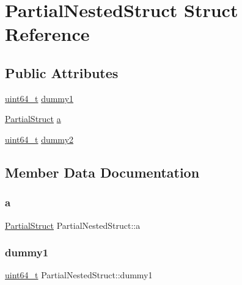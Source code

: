 \hypertarget{struct_partial_nested_struct}{}\section{Partial\+Nested\+Struct Struct Reference}
\label{struct_partial_nested_struct}
\subsection*{Public Attributes}
\begin{DoxyCompactItemize}
\item 
\mbox{\hyperlink{_s_d_l__config_8h_aaa5d1cd013383c889537491c3cfd9aad}{uint64\+\_\+t}} \mbox{\hyperlink{struct_partial_nested_struct_a21905dc8e8423ea3d8f5df0dec057d5c}{dummy1}}
\item 
\mbox{\hyperlink{struct_partial_struct}{Partial\+Struct}} \mbox{\hyperlink{struct_partial_nested_struct_afdf4565a5a3f3da3d3d3c2c9d518cfa8}{a}}
\item 
\mbox{\hyperlink{_s_d_l__config_8h_aaa5d1cd013383c889537491c3cfd9aad}{uint64\+\_\+t}} \mbox{\hyperlink{struct_partial_nested_struct_a404444062ccd6ac2b1d86bfa8ac0220a}{dummy2}}
\end{DoxyCompactItemize}


\subsection{Member Data Documentation}
\mbox{\label{struct_partial_nested_struct_afdf4565a5a3f3da3d3d3c2c9d518cfa8}} 
\subsubsection{\texorpdfstring{a}{a}}
{\footnotesize\ttfamily \mbox{\hyperlink{struct_partial_struct}{Partial\+Struct}} Partial\+Nested\+Struct\+::a}

\mbox{\label{struct_partial_nested_struct_a21905dc8e8423ea3d8f5df0dec057d5c}} 
\subsubsection{\texorpdfstring{dummy1}{dummy1}}
{\footnotesize\ttfamily \mbox{\hyperlink{_s_d_l__config_8h_aaa5d1cd013383c889537491c3cfd9aad}{uint64\+\_\+t}} Partial\+Nested\+Struct\+::dummy1}

